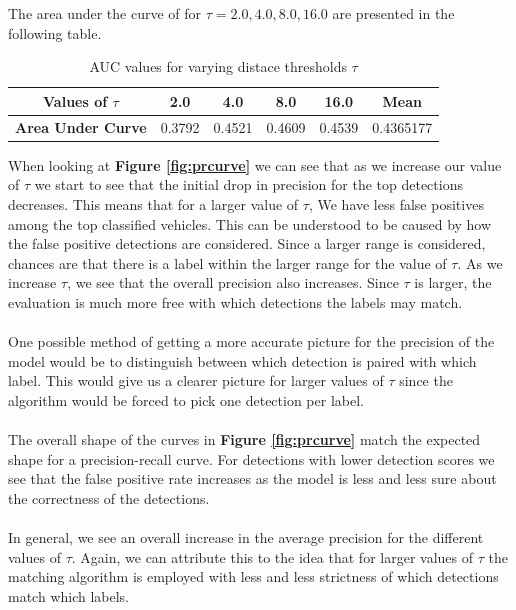 \documentclass[letter]{article}
\newcommand{\fref}[1]{\textbf{Figure \ref{#1}}}
\begin{document}
	\newpage
	The area under the curve of for $\tau=2.0, 4.0, 8.0, 16.0$ are presented in the following table.
	\begin{table}[!ht]
		\centering
		\begin{tabular}{|c|c|c|c|c|c|}
		\hline
		\textbf{Values of $\tau$} & 2.0 & 4.0 & 8.0 & 16.0 & \textbf{Mean} \\ \hline
		\textbf{Area Under Curve} & 0.3792 & 0.4521 & 0.4609 & 0.4539 & 0.4365177 \\ \hline
		\end{tabular}
		\caption{\label{tab:auc} AUC values for varying distace thresholds $\tau$}
	\end{table}

	When looking at \fref{fig:prcurve} we can see that as we increase our value of $\tau$ we start to see that the initial drop in precision for the top detections decreases. This means that for a larger value of $\tau$, We have less false positives among the top classified vehicles. This can be understood to be caused by how the false positive detections are considered. Since a larger range is considered, chances are that there is a label within the larger range for the value of $\tau$. As we increase $\tau$, we see that the overall precision also increases. Since $\tau$ is larger, the evaluation is much more free with which detections the labels may match.\\\\
	One possible method of getting a more accurate picture for the precision of the model would be to distinguish between which detection is paired with which label. This would give us a clearer picture for larger values of $\tau$ since the algorithm would be forced to pick one detection per label.\\\\
	The overall shape of the curves in \fref{fig:prcurve} match the expected shape for a precision-recall curve. For detections with lower detection scores we see that the false positive rate increases as the model is less and less sure about the correctness of the detections.\\\\
	In general, we see an overall increase in the average precision for the different values of $\tau$. Again, we can attribute this to the idea that for larger values of $\tau$ the matching algorithm is employed with less and less strictness of which detections match which labels.
\end{document}
